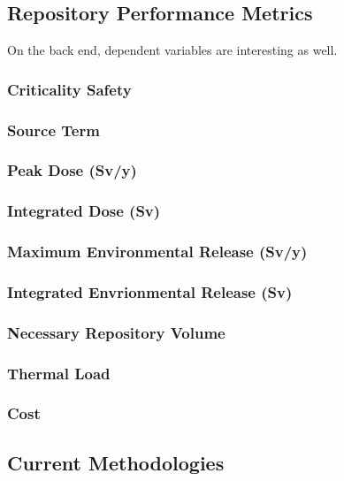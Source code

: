 \subsection{Repository Performance Metrics}
On the back end, dependent variables are interesting as well.  \subsubsection{Criticality Safety}
\subsubsection{Source Term}
\subsubsection{Peak Dose (Sv/y)}
\subsubsection{Integrated Dose (Sv)}
\subsubsection{Maximum Environmental Release (Sv/y)}
\subsubsection{Integrated Envrionmental Release (Sv)}
\subsubsection{Necessary Repository Volume}
\subsubsection{Thermal Load}
\subsubsection{Cost}
\subsection{Current Methodologies}



